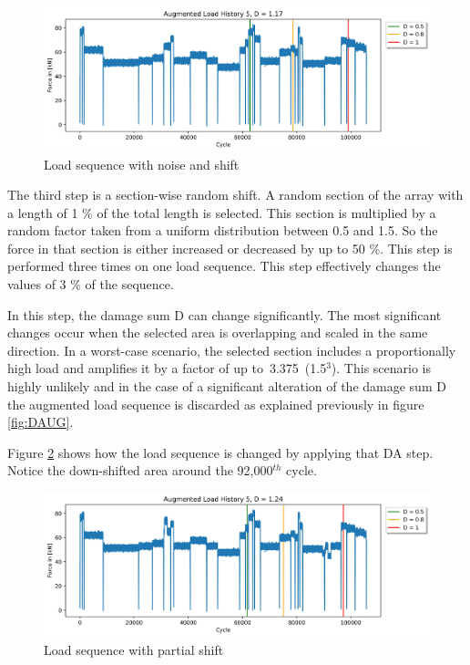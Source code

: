 \begin{figure}[H]
	\centering
	\includegraphics[width=1\linewidth]{IMGs/Verlauf_5_noise.jpg}
	\caption{Load sequence with noise and shift}
	\label{fig:V5_shift}
\end{figure}

The third step is a section-wise random shift. A random section of the array with a length of 1 \% of the total length is selected. This section is multiplied by a random factor taken from a uniform distribution between 0.5 and 1.5. So the force in that section is either increased or decreased by up to 50 \%. This step is performed three times on one load sequence. This step effectively changes the values of 3 \% of the sequence. 

In this step, the damage sum D can change significantly. The most significant changes occur when the selected area is overlapping and scaled in the same direction. In a worst-case scenario, the selected section includes a proportionally high load and amplifies it by a factor of up to~3.375~(1.5\(^3\)). This scenario is highly unlikely and in the case of a significant alteration of the damage sum D the augmented load sequence is discarded as explained previously in figure \ref{fig:DAUG}.
 
Figure \ref{fig:Verlauf_5_shift_partial} shows how the load sequence is changed by applying that DA step. Notice the down-shifted area around the 92,000\(^{th}\) cycle.


\begin{figure}[H]
	\centering
	\includegraphics[width=1\linewidth]{IMGs/Verlauf_5_shift_partial.jpg}
	\caption{Load sequence with partial shift}
	\label{fig:Verlauf_5_shift_partial}
\end{figure}

